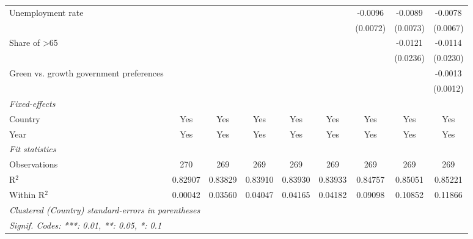\begin{table}[htbp]
\begin{tabular}{lcccccccc}
      Unemployment rate                                             &          &          &          &          &          & -0.0096  & -0.0089  & -0.0078\\   
                                                                    &          &          &          &          &          & (0.0072) & (0.0073) & (0.0067)\\   
      Share of >65                                                  &          &          &          &          &          &          & -0.0121  & -0.0114\\   
                                                                    &          &          &          &          &          &          & (0.0236) & (0.0230)\\   
      Green vs. growth government preferences                       &          &          &          &          &          &          &          & -0.0013\\   
                                                                    &          &          &          &          &          &          &          & (0.0012)\\   
      \midrule
      \emph{Fixed-effects}\\
      Country                                                       & Yes      & Yes      & Yes      & Yes      & Yes      & Yes      & Yes      & Yes\\  
      Year                                                          & Yes      & Yes      & Yes      & Yes      & Yes      & Yes      & Yes      & Yes\\  
      \midrule
      \emph{Fit statistics}\\
      Observations                                                  & 270      & 269      & 269      & 269      & 269      & 269      & 269      & 269\\  
      R$^2$                                                         & 0.82907  & 0.83829  & 0.83910  & 0.83930  & 0.83933  & 0.84757  & 0.85051  & 0.85221\\  
      Within R$^2$                                                  & 0.00042  & 0.03560  & 0.04047  & 0.04165  & 0.04182  & 0.09098  & 0.10852  & 0.11866\\  
      \midrule \midrule
      \multicolumn{9}{l}{\emph{Clustered (Country) standard-errors in parentheses}}\\
      \multicolumn{9}{l}{\emph{Signif. Codes: ***: 0.01, **: 0.05, *: 0.1}}\\
   \end{tabular}
\end{table}


